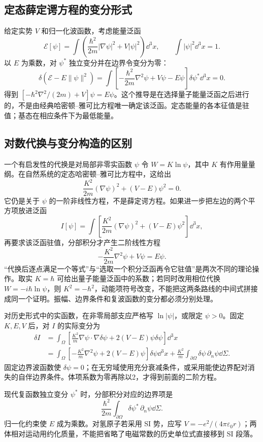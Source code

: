 \documentclass[UTF8,zihao=-4,fontset=fandol,a4paper]{ctexart}
\begin{document}
\subsection{定态薛定谔方程的变分形式}
给定实势 $V$ 和归一化波函数，考虑能量泛函
\[
\mathcal E[\psi]=\int\left(\frac{\hbar^2}{2m}|\nabla\psi|^2+V|\psi|^2\right)\dd^3x,
\qquad\int|\psi|^2\dd^3x=1.
\]
以 $E$ 为乘数，对 $\psi^*$ 独立变分并在边界令变分为零：
\[
\delta(\mathcal E-E\|\psi\|^2)=\int\left[-\frac{\hbar^2}{2m}\nabla^2\psi+V\psi-E\psi\right]\delta\psi^*\dd^3x=0.
\]
得到 $[-\hbar^2\nabla^2/(2m)+V]\psi=E\psi$。这个推导是在选择量子能量泛函之后进行的，不是由经典哈密顿--雅可比方程唯一确定该泛函。定态能量的各本征值是驻值；基态在相应条件下为最低能量。
\subsection{对数代换与变分构造的区别}
一个有启发性的代换是对局部非零实函数 $\psi$ 令 $W=K\ln\psi$，其中 $K$ 有作用量量纲。在自然系统的定态哈密顿--雅可比方程中，这给出
\[
\frac{K^2}{2m}(\nabla\psi)^2+(V-E)\psi^2=0.
\]
它仍是关于 $\psi$ 的一阶非线性方程，不是薛定谔方程。如果进一步把左边的两个平方项放进泛函
\[
I[\psi]=\int\left[\frac{K^2}{2m}(\nabla\psi)^2+(V-E)\psi^2\right]\dd^3x,
\]
再要求该泛函驻值，分部积分才产生二阶线性方程
\[
-\frac{K^2}{2m}\nabla^2\psi+V\psi=E\psi.
\]
“代换后逐点满足一个等式”与“选取一个积分泛函再令它驻值”是两次不同的理论操作。取实 $K=\hbar$ 可给出量子能量泛函中的系数；若同时改用相位代换 $W=-i\hbar\ln\psi$，则 $K^2=-\hbar^2$，动能项符号改变，不能把这两条路线的中间式拼接成同一个证明。振幅、边界条件和复波函数的变分都必须分别处理。

对历史形式中的实函数，在非零局部支应严格写 $\ln|\psi|$，或限定 $\psi>0$。固定 $K,E,V$ 后，对 $I$ 的实际变分为
\begin{align*}
\delta I
&=\int_\Omega\left[\frac{K^2}{m}\nabla\psi\cdot\nabla\delta\psi
+2(V-E)\psi\delta\psi\right]\dd^3x\\
&=\int_\Omega\left[-\frac{K^2}{m}\nabla^2\psi
+2(V-E)\psi\right]\delta\psi\dd^3x
+\frac{K^2}{m}\int_{\partial\Omega}\delta\psi\,\partial_n\psi\dd\Sigma.
\end{align*}
固定边界波函数使 $\delta\psi=0$；在无穷域使用充分衰减条件，或采用能使边界配对消失的自伴边界条件。体项系数为零再除以2，才得到前面的二阶方程。

现代复函数独立变分 $\psi^*$ 时，分部积分对应的边界项是
\[
\frac{\hbar^2}{2m}\int_{\partial\Omega}
\delta\psi^*\,\partial_n\psi\dd\Sigma.
\]
归一化约束使 $E$ 成为乘数。对氢原子若采用 SI 势，应写 $V=-e^2/(4\pi\varepsilon_0r)$；两体相对运动用约化质量，不能把省略了电磁常数的历史单位式直接移到 SI 段落。
\end{document}
